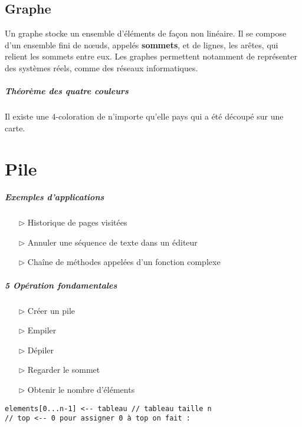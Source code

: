 \documentclass{report}
\begin{document}
\begin{multicols*}{3}
    \section{Graphe}
    Un graphe stocke un ensemble d’éléments de façon
    non linéaire. Il se compose d’un ensemble fini de
    nœuds, appelés \textbf{sommets}, et de lignes, les arêtes, qui
    relient les sommets entre eux. Les graphes permettent 
    notamment de représenter des systèmes réels, 
    comme des réseaux informatiques.

    \paragraph{Théorème des quatre couleurs}
    Il existe une $4$-coloration de n'importe qu'elle pays 
    qui a été découpé sur une carte. 


    \chapter{Pile}
    \paragraph{Exemples d'applications}
    \begin{itemize}
      \item [$\rhd$ ] Historique de pages visitées
      \item [$\rhd$ ] Annuler une séquence de texte dans un éditeur 
      \item [$\rhd$ ] Chaîne de méthodes appelées d'un fonction complexe
    \end{itemize}

    \paragraph{5 Opération fondamentales}
    \begin{itemize}
      \item [$\rhd$ ] Créer un pile 
      \item [$\rhd$ ] Empiler 
      \item [$\rhd$ ] Dépiler 
      \item [$\rhd$ ] Regarder le sommet 
      \item [$\rhd$ ] Obtenir le nombre d'éléments
    \end{itemize}

    \begin{lstlisting}
elements[0...n-1] <-- tableau // tableau taille n
// top <-- 0 pour assigner 0 à top on fait :


\end{lstlisting}
\end{multicols*}
\end{document}
